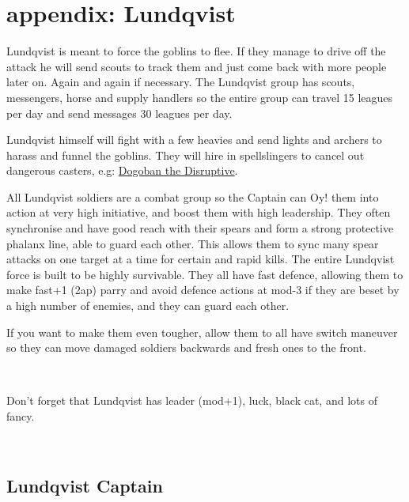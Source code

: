\clearpage
\section*{appendix: Lundqvist}
\label{appendixlundqvist}

\raggedbottom

Lundqvist is meant to force the goblins to flee. If they manage to drive off the attack he will send scouts to track them and just come back with more people later on. Again and again if necessary. 
The Lundqvist group has scouts, messengers, horse and supply handlers so the entire group can travel 15 leagues per day and send messages 30 leagues per day.

Lundqvist himself will fight with a few heavies and send lights and archers to harass and funnel the goblins. They will hire in spellslingers to cancel out dangerous casters, e.g: \hyperref[dogobanthedisruptive]{Dogoban the Disruptive}.

All Lundqvist soldiers are a combat group so the Captain can Oy! them into action at very high initiative, and boost them with high leadership. They often synchronise and have good reach with their spears and form a strong protective phalanx line, able to guard each other. This allows them to sync many spear attacks on one target at a time for certain and rapid kills. 
The entire Lundqvist force is built to be highly survivable. They all have fast defence, allowing them to make fast+1 (2ap) parry and avoid defence actions at mod-3 if they are beset by a high number of enemies, and they can guard each other.

If you want to make them even tougher, allow them to all have switch maneuver so they can move damaged soldiers backwards and fresh ones to the front.

\

\noindent Don't forget that Lundqvist has leader (mod+1), luck, black cat, and lots of fancy.

\

\subsection*{Lundqvist Captain}

